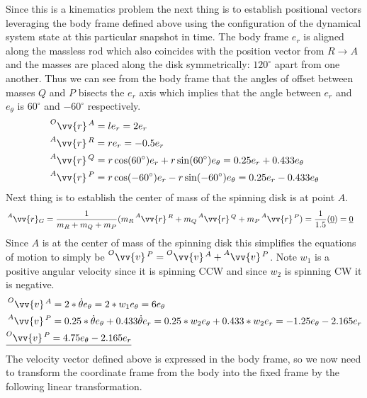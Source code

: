 \documentclass{article}
\begin{document}
Since this is a kinematics problem the next thing is to establish positional vectors leveraging the body frame defined above using the configuration of the dynamical system state at this particular snapshot in time. The body frame $e_r$ is aligned along the massless rod which also coincides with the position vector from $R \to A$ and the masses are placed along the disk symmetrically: $120^\circ$ apart from one another. Thus we can see from the body frame that the angles of offset between masses $Q$ and $P$ bisects the $e_r$ axis which implies that the angle between $e_r$ and $e_{\theta}$ is $60^\circ$ and $-60^\circ$ respectively.
\begin{align*}
    & \prescript{O}{}{\vv{r}}^{\, A} = l e_r = 2 e_r \\
    & \prescript{A}{}{\vv{r}}^{\, R} = r e_r = -0.5 e_r \\
    & \prescript{A}{}{\vv{r}}^{\, Q} = r \cos(60^\circ) e_r + r \sin(60^\circ) e_{\theta} = 0.25 e_r + 0.433 e_{\theta} \\
    & \prescript{A}{}{\vv{r}}^{\, P} = r \cos(-60^\circ) e_r - r \sin(-60^\circ) e_{\theta} = 0.25 e_r - 0.433 e_{\theta}
\end{align*}
Next thing is to establish the center of mass of the spinning disk is at point $A$.
\begin{align*}
    & \prescript{A}{}{\vv{r}}_G = \frac{1}{m_R + m_Q + m_P}(m_R \prescript{A}{}{\vv{r}}^{\, R} + m_Q \prescript{A}{}{\vv{r}}^{\, Q} + m_P \prescript{A}{}{\vv{r}}^{\, P}) = \frac{1}{1.5}(\underline{0}) = \underbar{0}
\end{align*}
Since $A$ is at the center of mass of the spinning disk this simplifies the equations of motion to simply be $\prescript{O}{}{\vv{v}}^{\, P} = \prescript{O}{}{\vv{v}}^{\, A} + \prescript{A}{}{\vv{v}}^{\, P}$. Note $w_1$ is a positive angular velocity since it is spinning CCW and since $w_2$ is spinning CW it is negative.
\begin{align*}
    & \prescript{O}{}{\vv{v}}^{\, A} = 2 * \dot{\theta} e_{\theta} = 2 * w_1 e_{\theta} = 6 e_{\theta} \\
    & \prescript{A}{}{\vv{v}}^{\, P} = 0.25 * \dot{\theta} e_{\theta} + 0.433 \dot{\theta} e_r = 0.25 * w_2 e_{\theta} + 0.433 * w_2 e_r = -1.25 e_{\theta} - 2.165 e_r \\
    & \underline{\prescript{O}{}{\vv{v}}^{\, P} = 4.75 e_{\theta} - 2.165 e_r}
\end{align*}
The velocity vector defined above is expressed in the body frame, so we now need to transform the coordinate frame from the body into the fixed frame by the following linear transformation.
\end{document}
